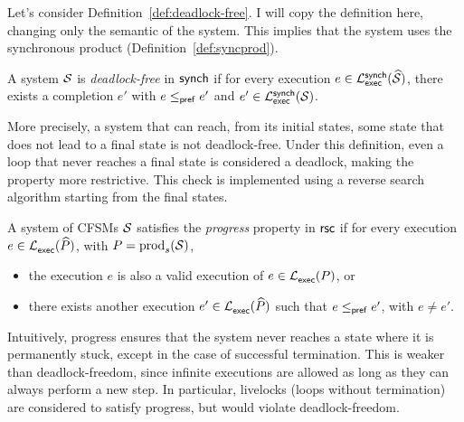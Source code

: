 Let's consider Definition~\ref{def:deadlock-free}. I will copy the 
definition here, changing only the semantic of the system. This implies 
that the system uses the synchronous product (Definition~\ref{def:syncprod}).

\bigskip

\begin{definition}
A system $\mathcal{S}$ is \emph{deadlock-free} in $\mathsf{synch}$  
if for every execution 
$e \in \mathcal{L}_{\mathsf{exec}}^{\mathsf{synch}}(\widehat{\mathcal{S}})$,  
there exists a completion $e'$ with $e \mathrel{\leq_{\mathsf{pref}}} e'$ and  
$e' \in \mathcal{L}_{\mathsf{exec}}^{\mathsf{synch}}(\mathcal{S})$.  
\end{definition}


More precisely, a system that can reach, from its initial states, some state
that does not lead to a final state is not deadlock-free. Under this definition,
even a loop that never reaches a final state is considered a deadlock,
making the property more restrictive. This check is implemented using a
reverse search algorithm starting from the final states.



\bigskip

\begin{definition}[Progress]\label{def:progress}
A system of CFSMs $\mathcal{S}$ satisfies the \emph{progress} property in $\mathsf{rsc}$
if for every execution $e \in \mathcal{L}_{\mathsf{exec}}^{}(\widehat{P})$, 
with $P = \mathrm{prod}_s(\mathcal{S})$,
\begin{itemize}
    \item the execution $e$ is also a valid execution of $e\in \mathcal{L}_{\mathsf{exec}}^{}(P)$, or
    \item there exists another execution $e'\in\mathcal{L}_{\mathsf{exec}}^{}(\widehat{P})$
          such that $e \mathrel{\leq_{\mathsf{pref}}} e'$, with $e \neq e'$.
\end{itemize}
\end{definition}

Intuitively, progress ensures that the system never reaches a state
where it is permanently stuck, except in the case of successful termination.
This is weaker than deadlock-freedom, since infinite executions are allowed
as long as they can always perform a new step. In particular, livelocks
(loops without termination) are considered to satisfy progress, but would
violate deadlock-freedom.

